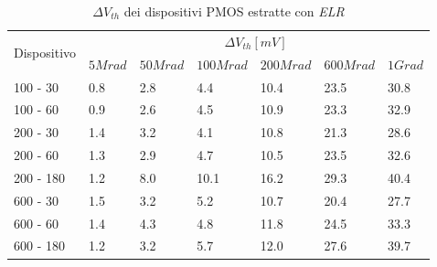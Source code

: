 \documentclass[12pt, letterpaper]{book}
\begin{document}
\begin{table}[H]
  \renewcommand{\arraystretch}{1.3}
  \begin{tabular}{m{2cm}  m{1.1cm} m{1.3cm} m{1.5cm} m{1.5cm} m{1.5cm} m{1cm}}
    \toprule
    \multirow{2}{*}{Dispositivo} & \multicolumn{6}{c}{$\Delta V_{th} [mV] $}                                                          \\
    \cmidrule{2-7}
                                 & $5Mrad$                            & $50Mrad$ & $100Mrad$ & $200Mrad$ & $600Mrad$ & $1Grad$ \\
    \midrule
    100 - 30                     & 0.8                                & 2.8      & 4.4       & 10.4      & 23.5      & 30.8    \\
    \hline
    100 - 60                     & 0.9                                & 2.6      & 4.5       & 10.9      & 23.3      & 32.9    \\
    \hline
    200 - 30                     & 1.4                                & 3.2      & 4.1       & 10.8      & 21.3      & 28.6    \\
    \hline
    200 - 60                     & 1.3                                & 2.9      & 4.7       & 10.5      & 23.5      & 32.6    \\
    \hline
    200 - 180                    & 1.2                                & 8.0      & 10.1      & 16.2      & 29.3      & 40.4    \\
    \hline
    600 - 30                     & 1.5                                & 3.2      & 5.2       & 10.7      & 20.4      & 27.7    \\
    \hline
    600 - 60                     & 1.4                                & 4.3      & 4.8       & 11.8      & 24.5      & 33.3    \\
    \hline
    600 - 180                    & 1.2                                & 3.2      & 5.7       & 12.0      & 27.6      & 39.7    \\
    \bottomrule
  \end{tabular}
  \caption{$\Delta V_{th}$ dei dispositivi PMOS estratte con \emph{ELR}}
  \label{tab:deltaVthELRP}
\end{table}
\end{document}
